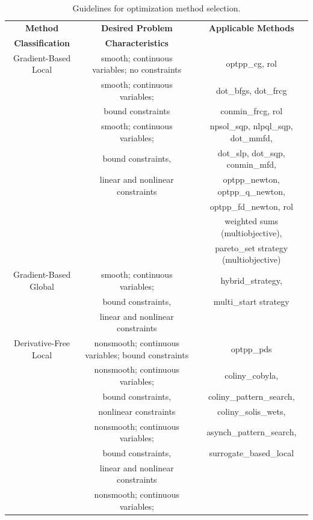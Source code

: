 \begin{table}[hbp]
\centering
\caption{Guidelines for optimization method selection.} 
\label{opt:usage:guideopt}\vspace{2mm}
\begin{tabular}{|c|c|c|}
\hline
\textbf{Method} & \textbf{Desired Problem} & \textbf{Applicable Methods} \\
\textbf{Classification} & \textbf{Characteristics} & \\
\hline
Gradient-Based Local & smooth; continuous variables; no constraints
& optpp\_cg, rol \\
\hline
         & smooth; continuous variables; & dot\_bfgs, dot\_frcg \\
         & bound constraints & conmin\_frcg, rol \\
\hline
         & smooth; continuous variables; & npsol\_sqp, nlpql\_sqp, dot\_mmfd, \\
         & bound constraints, & dot\_slp, dot\_sqp,
         conmin\_mfd, \\
         & linear and nonlinear constraints & optpp\_newton,
         optpp\_q\_newton, \\
         &          &optpp\_fd\_newton, rol \\
         &          & weighted sums (multiobjective), \\
         &          & pareto\_set strategy (multiobjective) \\
\hline
Gradient-Based Global & smooth; continuous variables; & hybrid\_strategy, \\
         &  bound constraints, & multi\_start strategy \\
         &  linear and nonlinear constraints & \\
\hline
Derivative-Free Local & nonsmooth; continuous variables; bound constraints
& optpp\_pds \\
\hline
         & nonsmooth; continuous variables; & coliny\_cobyla,  \\
         & bound constraints, & coliny\_pattern\_search, \\
         & nonlinear constraints & coliny\_solis\_wets, \\
\hline
         & nonsmooth; continuous variables; & asynch\_pattern\_search, \\
         & bound constraints, & surrogate\_based\_local \\
         & linear and nonlinear constraints & \\
\hline
         & nonsmooth; continuous variables; &  \\

\end{tabular}
\end{table}
